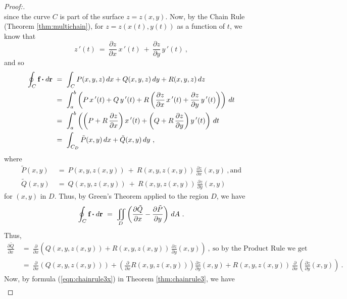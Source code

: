 \begin{proofbar}
\begin{proof}[Proof:]
\begin{displaymath}
 \end{displaymath}
 since the curve $C$ is part of the surface $z=z(x,y)$. Now, by the Chain Rule (Theorem \ref{thm:multichain}), for $z=z(x(t),y(t))$ as a function of $t$, we know that
 \begin{displaymath}
  z\,'(t) ~=~ \frac{\partial z}{\partial x}\,x\,'(t) ~+~ \frac{\partial z}{\partial y}\,y\,'(t) ~,
 \end{displaymath}
 and so
 \begin{align*}
  \oint_{C} \textbf{f} \bm{\cdot} d\textbf{r} ~&=~ \int_C P(x,y,z)\,dx + Q(x,y,z)\,dy + R(x,y,z)\,dz\\
   &=~ \int_a^b \left( P\,x\,'(t) + Q\,y\,'(t) +
    R\left( \frac{\partial z}{\partial x}\,x\,'(t) + \frac{\partial z}{\partial y}\,y\,'(t)
    \right) \right)\,dt\\
   &=~ \int_a^b \left( \left( P+R\,\frac{\partial z}{\partial x} \right) x\,'(t) +
    \left( Q+R\,\frac{\partial z}{\partial y} \right) y\,'(t) \right)\,dt\\
   &=~ \int_{C_D} \tilde{P}(x,y)\,dx + \tilde{Q}(x,y)\,dy ~,
 \end{align*}
 where
 \begin{align*}
  \tilde{P}(x,y) ~&=~ P(x,y,z(x,y)) ~+~ R(x,y,z(x,y))\,\frac{\partial z}{\partial x}(x,y)~,\text{and}\\
  \tilde{Q}(x,y) ~&=~ Q(x,y,z(x,y)) ~+~ R(x,y,z(x,y))\,\frac{\partial z}{\partial y}(x,y)
 \end{align*}
 for $(x,y)$ in $D$. Thus, by Green's Theorem applied to the region $D$, we have
 \begin{equation}\label{eqn:stokesproof}
  \oint_{C} \textbf{f} \bm{\cdot} d\textbf{r} ~=~ \iint\limits_{D} \left( \frac{\partial \tilde{Q}}{\partial x} -
   \frac{\partial \tilde{P}}{\partial y} \right)\,dA ~.
 \end{equation}
 Thus,
 \begin{align*}
  \frac{\partial \tilde{Q}}{\partial x} ~&=~ \frac{\partial}{\partial x} \left( Q(x,y,z(x,y)) +
   R(x,y,z(x,y))\,\frac{\partial z}{\partial y}(x,y) \right) ~,~\text{so by the Product Rule we get}\\
   &=~ \frac{\partial}{\partial x} \left( Q(x,y,z(x,y)) \right) + \left( \frac{\partial}{\partial x} R(x,y,z(x,y))
   \right) \frac{\partial z}{\partial y}(x,y) + R(x,y,z(x,y))\,\frac{\partial}{\partial x} \left(
   \frac{\partial z}{\partial y}(x,y) \right) ~.
 \end{align*}
 Now, by formula (\ref{eqn:chainrule3x}) in Theorem \ref{thm:chainrule3}, we have
 \begin{align*}

\end{align*}
\end{proof}
\end{proofbar}
